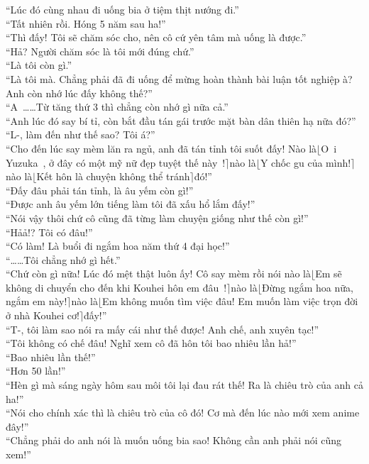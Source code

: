 \documentclass[12pt,a4paper, twosides]{book}
\begin{document}
“Lúc đó cùng nhau đi uống bia ở tiệm thịt nướng đi.”\\
“Tất nhiên rồi. Hóng 5 năm sau ha!”\\
“Thì đấy! Tôi sẽ chăm sóc cho, nên cô cứ yên tâm mà uống là được.”\\
“Hả? Người chăm sóc là tôi mới đúng chứ.”\\
“Là tôi còn gì.”\\
“Là tôi mà. Chẳng phải đã đi uống để mừng hoàn thành bài luận tốt nghiệp à? Anh còn nhớ lúc đấy không thế?”\\
“A~……Từ tăng thứ 3 thì chẳng còn nhớ gì nữa cả.”\\
“Anh lúc đó say bí tỉ, còn bắt đầu tán gái trước mặt bàn dân thiên hạ nữa đó?”\\
“L-, làm đến như thế sao? Tôi á?”\\
“Cho đến lúc say mèm lăn ra ngủ, anh đã tán tỉnh tôi suốt đấy! Nào là$\lfloor$O~i Yuzuka~, ở đây có một mỹ nữ đẹp tuyệt thế này~!$\rceil$nào là$\lfloor$Y chốc gu của mình!$\rceil$nào là$\lfloor$Kết hôn là chuyện không thể tránh$\rceil$đó!”\\
“Đấy đâu phải tán tỉnh, là âu yếm còn gì!”\\
“Được anh âu yếm lớn tiếng làm tôi đã xấu hổ lắm đấy!”\\
“Nói vậy thôi chứ cô cũng đã từng làm chuyện giống như thế còn gì!”\\
“Hảả!? Tôi có đâu!”\\
“Có làm! Là buổi đi ngắm hoa năm thứ 4 đại học!”\\
“……Tôi chẳng nhớ gì hết.”\\
“Chứ còn gì nữa! Lúc đó mệt thật luôn ấy! Cô say mèm rồi nói nào là$\lfloor$Em sẽ không di chuyển cho đến khi Kouhei hôn em đâu~!$\rceil$nào là$\lfloor$Đừng ngắm hoa nữa, ngắm em này!$\rceil$nào là$\lfloor$Em không muốn tìm việc đâu! Em muốn làm việc trọn đời ở nhà Kouhei cơ!$\rceil$đấy!”\\
“T-, tôi làm sao nói ra mấy cái như thế được! Anh chế, anh xuyên tạc!”\\
“Tôi không có chế đâu! Nghĩ xem cô đã hôn tôi bao nhiêu lần hả!”\\
“Bao nhiêu lần thế!”\\
“Hơn 50 lần!”\\
“Hèn gì mà sáng ngày hôm sau môi tôi lại đau rát thế! Ra là chiêu trò của anh cả ha!”\\
“Nói cho chính xác thì là chiêu trò của cô đó! Cơ mà đến lúc nào mới xem anime đây!”\\
“Chẳng phải do anh nói là muốn uống bia sao! Không cần anh phải nói cũng xem!”\\
\end{document}
